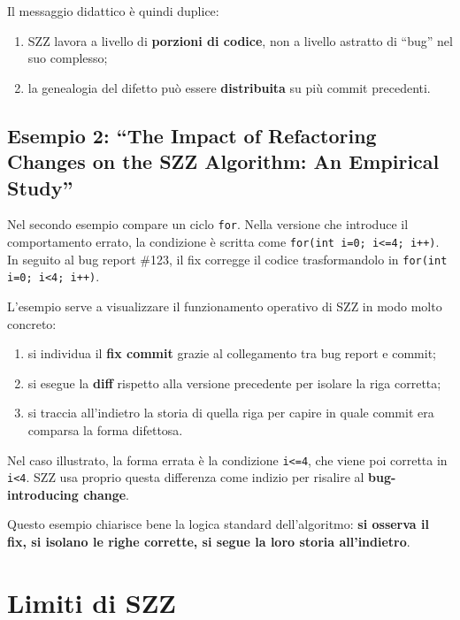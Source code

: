 Il messaggio didattico è quindi duplice:

\begin{enumerate}
    \item SZZ lavora a livello di \textbf{porzioni di codice}, non a livello astratto di ``bug'' nel suo complesso;
    \item la genealogia del difetto può essere \textbf{distribuita} su più commit precedenti.
\end{enumerate}

\subsection{Esempio 2: ``The Impact of Refactoring Changes on the SZZ Algorithm: An Empirical Study''}

\begin{notaprof}
Nel secondo esempio compare un ciclo \texttt{for}. Nella versione che introduce il comportamento errato, la condizione è scritta come \texttt{for(int i=0; i<=4; i++)}. In seguito al bug report \#123, il fix corregge il codice trasformandolo in \texttt{for(int i=0; i<4; i++)}.
\end{notaprof}

L'esempio serve a visualizzare il funzionamento operativo di SZZ in modo molto concreto:

\begin{enumerate}
    \item si individua il \textbf{fix commit} grazie al collegamento tra bug report e commit;
    \item si esegue la \textbf{diff} rispetto alla versione precedente per isolare la riga corretta;
    \item si traccia all'indietro la storia di quella riga per capire in quale commit era comparsa la forma difettosa.
\end{enumerate}

Nel caso illustrato, la forma errata è la condizione \texttt{i<=4}, che viene poi corretta in \texttt{i<4}. SZZ usa proprio questa differenza come indizio per risalire al \textbf{bug-introducing change}.

Questo esempio chiarisce bene la logica standard dell'algoritmo: \textbf{si osserva il fix, si isolano le righe corrette, si segue la loro storia all'indietro}.

\section{Limiti di SZZ}

